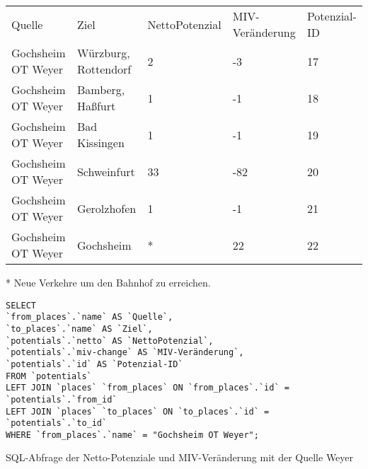 \begin{tabularx}{\textwidth}{*5{X}}
Quelle & Ziel & NettoPotenzial & MIV-Veränderung & Potenzial-ID\\ 
Gochsheim OT Weyer & Würzburg, Rottendorf & 2 & -3 & 17\\ 
Gochsheim OT Weyer & Bamberg, Haßfurt & 1 & -1 & 18\\ 
Gochsheim OT Weyer & Bad Kissingen & 1 & -1 & 19\\ 
Gochsheim OT Weyer & Schweinfurt & 33 & -82 & 20\\ 
Gochsheim OT Weyer & Gerolzhofen & 1 & -1 & 21\\ 
Gochsheim OT Weyer & Gochsheim & * & 22 & 22\\ 
\end{tabularx}
\newline
\newline
* Neue Verkehre um den Bahnhof zu erreichen.
\newline
\begin{listing}[htbp]
\begin{verbatim}
SELECT
`from_places`.`name` AS `Quelle`, 
`to_places`.`name` AS `Ziel`, 
`potentials`.`netto` AS `NettoPotenzial`, 
`potentials`.`miv-change` AS `MIV-Veränderung`, 
`potentials`.`id` AS `Potenzial-ID`
FROM `potentials`
LEFT JOIN `places` `from_places` ON `from_places`.`id` = `potentials`.`from_id`
LEFT JOIN `places` `to_places` ON `to_places`.`id` = `potentials`.`to_id`
WHERE `from_places`.`name` = "Gochsheim OT Weyer";
\end{verbatim}
\caption{SQL-Abfrage der Netto-Potenziale und MIV-Veränderung mit der Quelle Weyer}\label{lst-fz-weyer}
\end{listing}